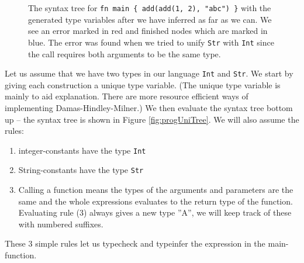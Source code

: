 \begin{figure}
\centering
{}
  \cprotect\caption{The syntax tree for \verb|fn main { add(add(1, 2), "abc") }| with the generated type variables after we have inferred as far as we can. We see an error marked in red and finished nodes which are marked in blue. The error was found when we tried to unify \verb|Str| with \verb|Int| since the call requires both arguments to be the same type.}
  \label{fig:progUniTreeAfter}
\end{figure}


Let us assume that we have two types in our language \verb+Int+ and \verb+Str+. We start by giving each construction a unique type variable. (The unique type variable is mainly to aid explanation. There are more resource efficient ways of implementing Damas-Hindley-Milner.) We then evaluate the syntax tree bottom up -- the syntax tree is shown in Figure \ref{fig:progUniTree}. We will also assume the rules: 
\begin{enumerate}
  \item integer-constants have the type \verb+Int+
  \item String-constants have the type \verb+Str+
  \item Calling a function means the types of the arguments and parameters are the same and the whole expressions evaluates to the return type of the function. Evaluating rule (3) always gives a new type ''A'', we will keep track of these with numbered suffixes.
\end{enumerate}
These 3 simple rules let us typecheck and typeinfer the expression in the main-function.

